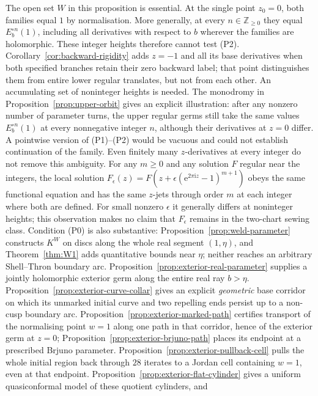 \documentclass[11pt,a4paper]{article}
\theoremstyle{definition}
\newcommand{\Kk}{K}
\newcommand{\eee}{\mathrm{e}}
\newcommand{\ii}{\mathrm{i}}
\begin{document}
The open set $W$ in this proposition is essential.  At the single point
$z_0=0$, both families equal $1$ by normalisation.  More generally, at every
$n\in\mathbb Z_{\ge0}$ they equal $E_b^{\circ n}(1)$, including all derivatives
with respect to $b$ wherever the families are holomorphic.  These integer
heights therefore cannot test (P2).  Corollary~\ref{cor:backward-rigidity}
adds $z=-1$ and all its base derivatives when both specified branches
retain their zero backward label; that point distinguishes them from
entire lower regular translates, but not from each other.
An accumulating set of noninteger heights
is needed.  The monodromy in Proposition~\ref{prop:upper-orbit} gives an
explicit illustration: after any nonzero number of parameter turns, the upper
regular germs still take the same values $E_b^{\circ n}(1)$ at every
nonnegative integer $n$, although their derivatives at $z=0$ differ.
A pointwise version of (P1)--(P2) would be vacuous and could not
establish continuation of the family.
Even finitely many $z$-derivatives at every integer do not remove this
ambiguity.  For any $m\ge0$ and any solution $F$ regular near the
integers, the local solution
$F_\epsilon(z)=F(z+\epsilon(\eee^{2\pi\ii z}-1)^{m+1})$ obeys the same
functional equation and has the same $z$-jets through order $m$ at
each integer where both are defined.  For small nonzero $\epsilon$ it
generally differs at noninteger heights; this observation makes no
claim that $F_\epsilon$ remains in the two-chart sewing class.
Condition (P0) is also substantive: Proposition~\ref{prop:weld-parameter}
constructs $\Kk^W$ on discs along the whole real segment $(1,\eta)$, and
Theorem~\ref{thm:W1} adds quantitative bounds near $\eta$; neither reaches
an arbitrary Shell--Thron boundary arc.  Proposition~\ref{prop:exterior-real-parameter} supplies a jointly
holomorphic exterior germ along the entire real ray $b>\eta$.
Proposition~\ref{prop:exterior-curve-collar} gives an explicit
\emph{geometric} base corridor on which its unmarked initial curve and
two repelling ends persist up to a non-cusp boundary arc.
Proposition~\ref{prop:exterior-marked-path} certifies transport of the
normalising point $w=1$ along one path in that corridor, hence of the
exterior germ at $z=0$; Proposition~\ref{prop:exterior-brjuno-path}
places its endpoint at a prescribed Brjuno parameter.
Proposition~\ref{prop:exterior-pullback-cell} pulls the whole initial
region back through $28$ iterates to a Jordan cell containing $w=1$,
even at that endpoint.
Proposition~\ref{prop:exterior-flat-cylinder} gives a uniform
quasiconformal model of these quotient cylinders, and
\end{document}
